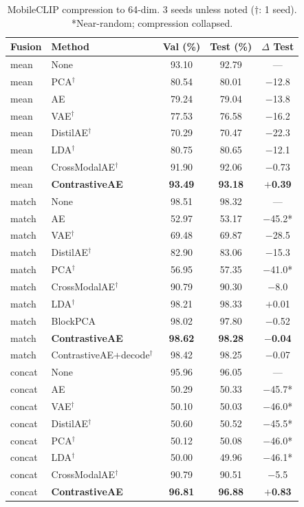 \documentclass[10pt,twocolumn]{article}
\begin{document}
\begin{table}[h]
\centering
\caption{MobileCLIP compression to 64-dim. 3 seeds unless noted
($\dag$: 1 seed). *Near-random; compression collapsed.}
\label{tab:mc_compression}
\begin{tabular}{llccc}
\toprule
Fusion & Method & Val (\%) & Test (\%) & $\Delta$ Test \\
\midrule
mean  & None            & 93.10 & 92.79 & --- \\
mean  & PCA$^\dag$      & 80.54 & 80.01 & $-$12.8 \\
mean  & AE              & 79.24 & 79.04 & $-$13.8 \\
mean  & VAE$^\dag$      & 77.53 & 76.58 & $-$16.2 \\
mean  & DistilAE$^\dag$ & 70.29 & 70.47 & $-$22.3 \\
mean  & LDA$^\dag$      & 80.75 & 80.65 & $-$12.1 \\
mean  & CrossModalAE$^\dag$ & 91.90 & 92.06 & $-$0.73 \\
mean  & \textbf{ContrastiveAE} & \textbf{93.49} & \textbf{93.18} & \textbf{$+$0.39} \\
\midrule
match & None            & 98.51 & 98.32 & --- \\
match & AE              & 52.97 & 53.17 & $-$45.2* \\
match & VAE$^\dag$      & 69.48 & 69.87 & $-$28.5 \\
match & DistilAE$^\dag$ & 82.90 & 83.06 & $-$15.3 \\
match & PCA$^\dag$      & 56.95 & 57.35 & $-$41.0* \\
match & CrossModalAE$^\dag$ & 90.79 & 90.30 & $-$8.0 \\
match & LDA$^\dag$      & 98.21 & 98.33 & $+$0.01 \\
match & BlockPCA        & 98.02 & 97.80 & $-$0.52 \\
match & \textbf{ContrastiveAE} & \textbf{98.62} & \textbf{98.28} & \textbf{$-$0.04} \\
match & ContrastiveAE+decode$^\dag$ & 98.42 & 98.25 & $-$0.07 \\
\midrule
concat & None           & 95.96 & 96.05 & --- \\
concat & AE             & 50.29 & 50.33 & $-$45.7* \\
concat & VAE$^\dag$     & 50.10 & 50.03 & $-$46.0* \\
concat & DistilAE$^\dag$& 50.60 & 50.52 & $-$45.5* \\
concat & PCA$^\dag$     & 50.12 & 50.08 & $-$46.0* \\
concat & LDA$^\dag$     & 50.00 & 49.96 & $-$46.1* \\
concat & CrossModalAE$^\dag$ & 90.79 & 90.51 & $-$5.5 \\
concat & \textbf{ContrastiveAE} & \textbf{96.81} & \textbf{96.88} & \textbf{$+$0.83} \\
\bottomrule
\end{tabular}
\end{table}
\end{document}
